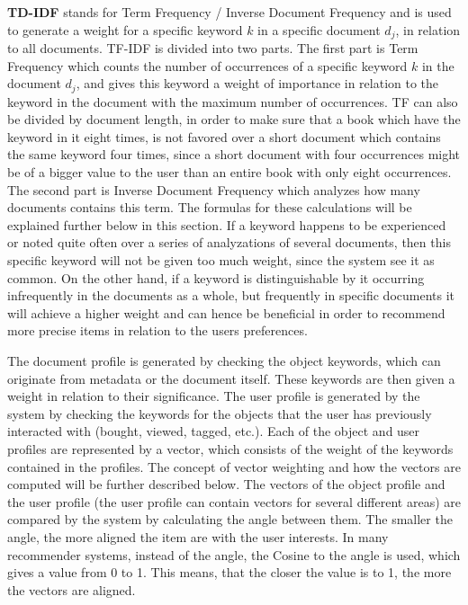 \textbf{TD-IDF} stands for Term Frequency / Inverse Document Frequency and is used to generate a weight for a specific keyword \(k\) in a specific document \(d_{j}\), in relation to all documents. TF-IDF is divided into two parts.\newline
The first part is Term Frequency which counts the number of occurrences of a specific keyword \(k\) in the document \(d_{j}\), and gives this keyword a weight of importance in relation to the keyword in the document with the maximum number of occurrences. TF can also be divided by document length, in order to make sure that a book which have the keyword in it eight times, is not favored over a short document which contains the same keyword four times, since a short document with four occurrences might be of a bigger value to the user than an entire book with only eight occurrences.\newline 
The second part is Inverse Document Frequency which analyzes how many documents contains this term. The formulas for these calculations will be explained further below in this section. \newline
If a keyword happens to be experienced or noted quite often over a series of analyzations of several documents, then this specific keyword will not be given too much weight, since the system see it as common. On the other hand, if a keyword is distinguishable by it occurring infrequently in the documents as a whole, but frequently in specific documents it will achieve a higher weight and can hence be beneficial in order to recommend more precise items in relation to the users preferences.\newline

The document profile is generated by checking the object keywords, which can originate from metadata or the document itself. These keywords are then given a weight in relation to their significance.
The user profile is generated by the system by checking the keywords for the objects that the user has previously interacted with (bought, viewed, tagged, etc.). Each of the object and user profiles are represented by a vector, which consists of the weight of the keywords contained in the profiles. The concept of vector weighting and how the vectors are computed will be further described below.
The vectors of the object profile and the user profile (the user profile can contain vectors for several different areas) are compared by the system by calculating the angle between them. The smaller the angle, the more aligned the item are with the user interests. In many recommender systems, instead of the angle, the Cosine to the angle is used, which gives a value from 0 to 1. This means, that the closer the value is to 1, the more the vectors are aligned.\newline

